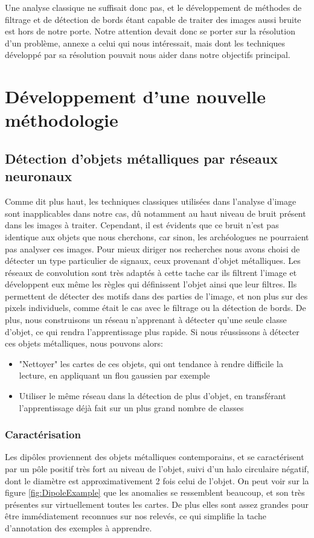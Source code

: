 \documentclass[a4paper, 12pt, titlepage, oneside, french]{article}
\begin{document}
	Une analyse classique ne suffisait donc pas, et le développement de méthodes de filtrage et de détection de bords étant capable de traiter des images aussi bruite est hors de notre porte. Notre attention devait donc se porter sur la résolution d'un problème, annexe a celui qui nous intéressait, mais dont les techniques développé par sa résolution pouvait nous aider dans notre objectifs principal.

\newpage
\section{Développement d'une nouvelle méthodologie}
	\subsection{Détection d'objets métalliques par réseaux neuronaux}
	Comme dit plus haut, les techniques classiques utilisées dans l'analyse d'image sont inapplicables dans notre cas, dû notamment au haut niveau de bruit présent dans les images à traiter. Cependant, il est évidents que ce bruit n'est pas identique aux objets que nous cherchons, car sinon, les archéologues ne pourraient pas analyser ces images. Pour mieux diriger nos recherches nous avons choisi de détecter un type particulier de signaux, ceux provenant d'objet métalliques. Les réseaux de convolution sont très adaptés à cette tache car ils filtrent l'image et développent eux même les règles qui définissent l'objet ainsi que leur filtres. Ils permettent de détecter des motifs dans des parties de l'image, et non plus sur des pixels individuels, comme était le cas avec le filtrage ou la détection de bords. De plus, nous construisons un réseau n'apprenant à détecter qu'une seule classe d'objet, ce qui rendra l'apprentissage plus rapide. Si nous réussissons à détecter ces objets métalliques, nous pouvons alors:
	\begin{itemize}
		\item "Nettoyer" les cartes de ces objets, qui ont tendance à rendre difficile la lecture, en appliquant un flou gaussien par exemple
		\item Utiliser le même réseau dans la détection de plus d'objet, en transférant l'apprentissage déjà fait sur un plus grand nombre de classes
	\end{itemize}

	\subsubsection{Caractérisation}
	Les dipôles proviennent des objets métalliques contemporains, et se caractérisent par un pôle positif très fort au niveau de l'objet, suivi d'un halo circulaire négatif, dont le diamètre est approximativement 2 fois celui de l'objet. On peut voir sur la figure \ref{fig:DipoleExample} que les anomalies se ressemblent beaucoup, et son très présentes sur virtuellement toutes les cartes. De plus elles sont assez grandes pour être immédiatement reconnues sur nos relevés, ce qui simplifie la tache d'annotation des exemples à apprendre. 
\end{document}
